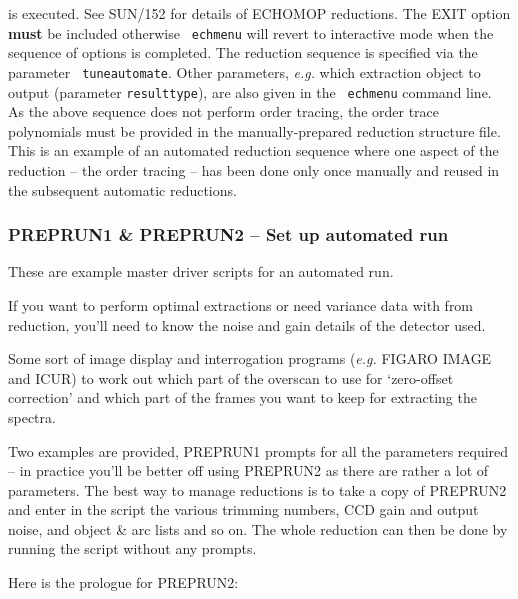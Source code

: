 \documentclass[twoside,11pt]{article}
\newcommand{\stardocinitials}  {SC}
\newcommand{\stardocnumber}    {3.2-0} %
\newcommand{\stardocname}{\stardocinitials /\stardocnumber}
\newcommand{\xref}[3]{#1}
\newcommand{\xlabel}[1]{}
\renewcommand{\_}{\texttt{\symbol{95}}}
\newcommand{\scspec}[2]{#1}
\newcommand{\scspec}[2]{#2}
\begin{document}
is executed.  See \xref{SUN/152}{sun152}{} for details of ECHOMOP reductions.
The EXIT option {\bf must} be included otherwise {\tt
echmenu} will revert to interactive mode when the sequence of options is
completed.  The reduction sequence is specified via the parameter {\tt
tune\_automate}\@.  Other parameters, {\it{e.g.}} which extraction object
to output (parameter {\tt result\_type}), are also given in the {\tt
echmenu} command line.  As the above sequence does not perform order tracing,
the order trace polynomials must be provided in the manually-prepared
reduction structure file.  This is an example of an automated reduction
sequence where one aspect of the reduction \scspec{--}{-} the order tracing
\scspec{--}{-} has been done only once manually and reused in the subsequent
automatic reductions.


\subsubsection{\label{se_preprun}\xlabel{preprun}PREPRUN1 \& PREPRUN2
               \scspec{--}{-} Set up automated run}
\markboth{PREPRUN}{\stardocname}

These are example master driver scripts for an automated run.

If you want to perform optimal extractions or need variance data with
from reduction,  you'll need to know the noise and gain details of the
detector used.

Some sort of image display and interrogation programs ({\it{e.g.}}
\xref{FIGARO}{sun86}{} \xref{IMAGE}{sun86}{IMAGE} and
\xref{ICUR}{sun86}{ICUR}) to work out which part of the overscan to use for
`zero-offset correction' and which part of the frames you want to keep for
extracting the spectra.

Two examples are provided, PREPRUN1 prompts for all the parameters required
\scspec{--}{-} in practice you'll be better off using PREPRUN2 as there are
rather a lot of parameters.  The best way to manage reductions is to take a
copy of PREPRUN2 and enter in the script the various trimming numbers,
CCD gain and output noise, and object \& arc lists and so on.  The whole
reduction can then be done by running the script without any prompts.

Here is the prologue for PREPRUN2:
\end{document}
